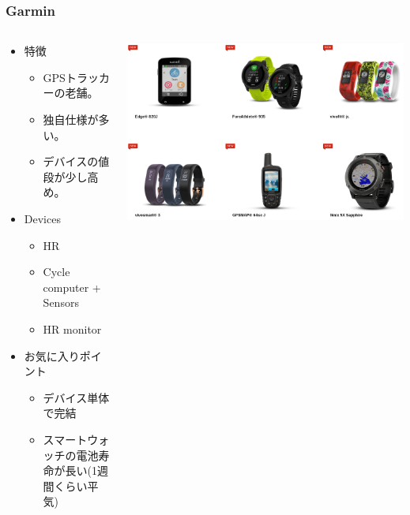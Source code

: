 \documentclass[aspectratio=169,11pt,hyperref={colorlinks=true}]{beamer}
\begin{document}
\begin{frame}
  \frametitle{Garmin}
  \begin{columns}[T]
    \begin{column}{.50\textwidth}
      \begin{itemize}
      \item[] 特徴
        \begin{itemize}
          \item GPSトラッカーの老舗。
          \item 独自仕様が多い。
          \item デバイスの値段が少し高め。
        \end{itemize}
      \item[] Devices
        \begin{itemize}
          \item HR
          \item Cycle computer + Sensors
          \item HR monitor
        \end{itemize}
      \item[] お気に入りポイント
        \begin{itemize}
          \item デバイス単体で完結
          \item スマートウォッチの電池寿命が長い(1週間くらい平気)
        \end{itemize}
      \end{itemize}
    \end{column}
    \begin{column}{.50\textwidth}
      \begin{center}
        \includegraphics[width=1.1\textwidth]{garmin_products.png}
      \end{center}
    \end{column}
  \end{columns}
\end{frame}
\end{document}
